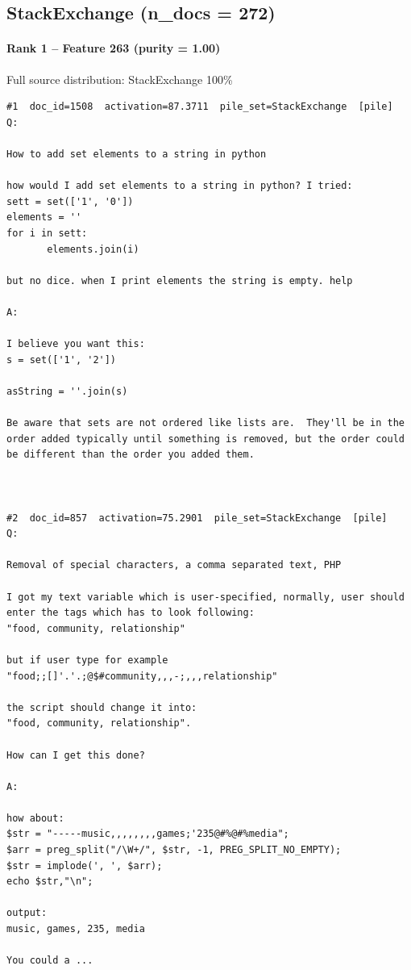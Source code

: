 \subsection*{StackExchange (n\_docs = 272)}

\paragraph*{Rank 1 -- Feature 263 (purity = 1.00)}

Full source distribution: StackExchange 100\%

\begin{verbatim}
#1  doc_id=1508  activation=87.3711  pile_set=StackExchange  [pile]
Q:

How to add set elements to a string in python

how would I add set elements to a string in python? I tried:
sett = set(['1', '0'])
elements = ''
for i in sett:
       elements.join(i)

but no dice. when I print elements the string is empty. help

A:

I believe you want this:
s = set(['1', '2'])

asString = ''.join(s)

Be aware that sets are not ordered like lists are.  They'll be in the order added typically until something is removed, but the order could be different than the order you added them.



#2  doc_id=857  activation=75.2901  pile_set=StackExchange  [pile]
Q:

Removal of special characters, a comma separated text, PHP

I got my text variable which is user-specified, normally, user should enter the tags which has to look following: 
"food, community, relationship"

but if user type for example 
"food;;[]'.'.;@$#community,,,-;,,,relationship"

the script should change it into: 
"food, community, relationship".

How can I get this done?

A:

how about:
$str = "-----music,,,,,,,,games;'235@#%@#%media";
$arr = preg_split("/\W+/", $str, -1, PREG_SPLIT_NO_EMPTY);
$str = implode(', ', $arr);
echo $str,"\n";

output:
music, games, 235, media

You could a ...


\end{verbatim}
